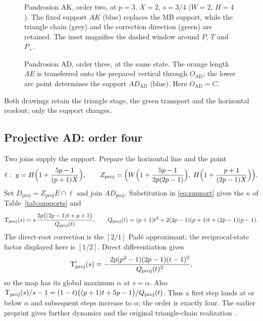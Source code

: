 \begin{figure}[h]
\centering\figAK
\caption{Pandrosion AK, order two, at $p=3$, $X=2$, $s=3/4$ ($W=2$, $H=4$). The fixed support $AK$
(blue) replaces the MB support, while the triangle chain (grey) and the correction direction (green)
are retained. The inset magnifies the dashed window around $P$, $T$ and $P_+$.}\label{fig:ak}
\end{figure}

\begin{figure}[h]
\centering\figAD
\caption{Pandrosion AD, order three, at the same state. The orange length $AE$ is transferred onto the
prepared vertical through $O_{\mathrm{AD}}$; the lower arc point determines the support
$AD_{\mathrm{AD}}$ (blue). Here $O_{\mathrm{AD}}=C$.}\label{fig:ad}
\end{figure}

Both drawings retain the triangle stage, the green transport and the horizontal readout; only the
support changes.

\subsection{Projective AD: order four}

Two joins supply the support. Prepare the horizontal line and the point
\[ \ell:\ y=H\Bigl(1+\frac{5p-1}{(p+1)X}\Bigr),\qquad
Z_{\mathrm{proj}}=\Bigl(W\Bigl(1+\frac{5p-1}{2p(2p-1)}\Bigr),\;H\Bigl(1+\frac{p+1}{(2p-1)X}\Bigr)\Bigr). \]
Set
$D_{\mathrm{proj}}=Z_{\mathrm{proj}}E\cap\ell$ and join $AD_{\mathrm{proj}}$. Substitution in
\eqref{eq:support} gives the $\kappa$ of Table~\ref{tab:supports} and
\begin{equation}\label{eq:proj}
\mathrm{T}_{\mathrm{proj}}(s)=s\,\frac{2p\bigl((2p-1)t+p+1\bigr)}{Q_{\mathrm{proj}}(t)},\qquad
Q_{\mathrm{proj}}(t)=(p+1)t^{2}+2(2p-1)(p+1)t+(2p-1)(p-1).
\end{equation}
The direct-root correction is the $[2/1]$ Pad\'e approximant; the reciprocal-state factor displayed
here is $[1/2]$. Direct differentiation gives
\[ \mathrm{T}_{\mathrm{proj}}'(s)=-\frac{2p(p^{2}-1)(2p-1)(t-1)^{3}}{Q_{\mathrm{proj}}(t)^{2}}, \]
so the map has its global maximum $\alpha$ at $s=\alpha$. Also
$\mathrm{T}_{\mathrm{proj}}(s)/s-1=(1-t)\bigl((p+1)t+5p-1\bigr)/Q_{\mathrm{proj}}(t)$. Thus a first step lands
at or below $\alpha$ and subsequent steps increase to $\alpha$; the order is exactly four. The
earlier preprint gives further dynamics and the original triangle-chain realization~\cite{v20}.


